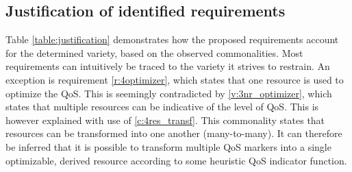 \subsection{Justification of identified requirements}
Table \ref{table:justification} demonstrates how the proposed requirements account for the determined variety, based on the observed commonalities. Most requirements can intuitively be traced  to the variety it strives to restrain. An exception is requirement \ref{r:4optimizer}, which states that one resource is used to optimize the QoS. This is seemingly contradicted by \ref{v:3nr_optimizer}, which states that multiple resources can be indicative of the level of QoS. This is however explained with use of \ref{c:4res_transf}. This commonality states that resources can be transformed into one another (many-to-many). It can therefore be inferred that it is possible to transform multiple QoS markers into a single optimizable, derived resource according to some heuristic QoS indicator function.


